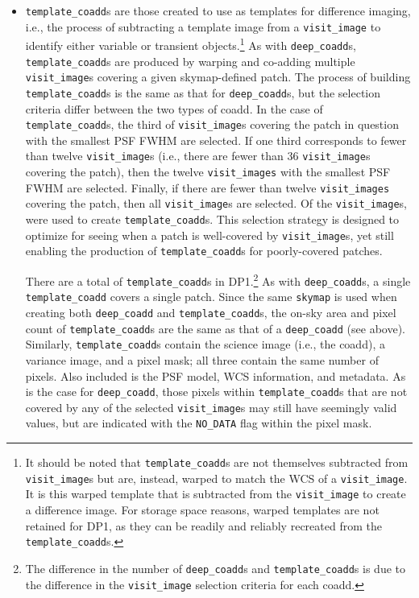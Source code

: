 \begin{itemize}
\item \texttt{template\_coadd}s are those created to use as templates for difference imaging, i.e., the process of subtracting a template image from a \texttt{visit\_image} to identify either variable or transient objects.\footnote{It should be noted that \texttt{template\_coadd}s are not themselves subtracted from \texttt{visit\_image}s but are, instead, warped to match the \gls{WCS} of a \texttt{visit\_image}.
It is this warped template that is subtracted from the \texttt{visit\_image} to create a difference image.
For storage space reasons, warped templates are not retained for \gls{DP1}, as they can be readily and reliably recreated from the \texttt{template\_coadd}s.}
As with \texttt{deep\_coadd}s, \texttt{template\_coadd}s are produced by warping and co-adding multiple \texttt{visit\_image}s covering a given skymap-defined \gls{patch}.
The process of building \texttt{template\_coadd}s is the same as that for \texttt{deep\_coadd}s, but the selection criteria differ between the two types of coadd.
In the case of \texttt{template\_coadd}s, the third of \texttt{visit\_image}s covering the patch in question with the smallest PSF \gls{FWHM} are selected.
If one third corresponds to fewer than twelve \texttt{visit\_image}s (i.e., there are fewer than 36 \texttt{visit\_image}s covering the patch), then the twelve \texttt{visit\_images} with the smallest PSF \gls{FWHM} are selected.
Finally, if there are fewer than twelve \texttt{visit\_images} covering the \gls{patch}, then all \texttt{visit\_image}s are selected. Of the \nvisitimages \texttt{visit\_image}s, \ntemplatevisitimages were used to create \texttt{template\_coadd}s.
This selection strategy is designed to optimize for \gls{seeing} when a patch is well-covered by \texttt{visit\_image}s, yet still enabling the production of \texttt{template\_coadd}s for poorly-covered patches.

There are a total of \ntemplatecoadds \texttt{template\_coadd}s in \gls{DP1}.\footnote{The difference in the number of \texttt{deep\_coadd}s and \texttt{template\_coadd}s is due to the difference in the \texttt{visit\_image} selection criteria for each coadd.}
As with \texttt{deep\_coadd}s, a single \texttt{template\_coadd} covers a single \gls{patch}.
Since the same \texttt{skymap} is used when creating both \texttt{deep\_coadd} and \texttt{template\_coadd}s, the on-sky area and pixel count of \texttt{template\_coadd}s are the same as that of a \texttt{deep\_coadd} (see above).
Similarly, \texttt{template\_coadd}s contain the science image (i.e., the coadd), a variance image, and a pixel mask; all three contain the same number of pixels.
Also included is the PSF model, \gls{WCS} information, and metadata.
As is the case for \texttt{deep\_coadd}, those pixels within \texttt{template\_coadd}s that are not covered by any of the selected \texttt{visit\_image}s may still have seemingly valid values, but are indicated with the \texttt{NO\_DATA} flag within the pixel mask.


\end{itemize}
